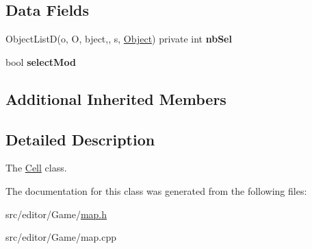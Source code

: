 \subsection*{Data Fields}
\begin{DoxyCompactItemize}
\item 
\hypertarget{class_cell_a70f60ede53fb663eb11dd543211bf4cf}{}\label{class_cell_a70f60ede53fb663eb11dd543211bf4cf} 
Object\+ListD(o, O, bject,, s, \hyperlink{class_object}{Object}) private int {\bfseries nb\+Sel}
\item 
\hypertarget{class_cell_a5891847674379c2fd25a4d08962a21ba}{}\label{class_cell_a5891847674379c2fd25a4d08962a21ba} 
bool {\bfseries select\+Mod}
\end{DoxyCompactItemize}
\subsection*{Additional Inherited Members}


\subsection{Detailed Description}
The \hyperlink{class_cell}{Cell} class. 

The documentation for this class was generated from the following files\+:\begin{DoxyCompactItemize}
\item 
src/editor/\+Game/\hyperlink{map_8h}{map.\+h}\item 
src/editor/\+Game/map.\+cpp\end{DoxyCompactItemize}
